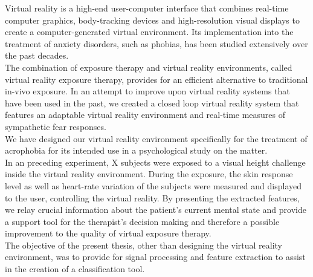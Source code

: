
Virtual reality is a high-end user-computer interface that combines real-time computer graphics, body-tracking devices and high-resolution visual displays to create a computer-generated virtual environment. Its implementation into the treatment of anxiety disorders, such as phobias, has been studied extensively over the past decades. \\
The combination of exposure therapy and virtual reality environments, called virtual reality exposure therapy, provides for an efficient alternative to traditional in-vivo exposure. In an attempt to improve upon virtual reality systems that have been used in the past, we created a closed loop virtual reality system that features an adaptable virtual reality environment and real-time measures of sympathetic fear responses.\\
We have designed our virtual reality environment specifically for the treatment of acrophobia for its intended use in a psychological study on the matter.\\
In an preceding experiment, X subjects were exposed to a visual height challenge inside the virtual reality environment. During the exposure, the skin response level as well as heart-rate variation of the subjects were measured and displayed to the user, controlling the virtual reality. By presenting the extracted features, we relay crucial information about the patient's current mental state and provide a support tool for the therapist's decision making and therefore a possible improvement to the quality of virtual exposure therapy. \\
The objective of the present thesis, other than designing the virtual reality environment, was to provide for signal processing and feature extraction to assist in the creation of a classification tool.   




